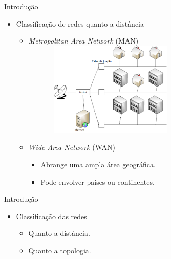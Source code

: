 \documentclass{libs/ufc_format}
\begin{document}
\begin{frame}{Introdução}
    \begin{itemize}
        \item Classificação de redes quanto a distância
            \begin{itemize}
                \item<1> \textit{Metropolitan Area Network} (MAN)\\
                \includegraphics[width=0.7\textwidth, height=4.5cm]{media/man}
                \item<2-> \textit{Wide Area Network} (WAN)
                    \begin{itemize}
                        \justifying
                        \item<3-> Abrange uma ampla área geográfica.
                        \item<3-> Pode envolver países ou continentes.
                    \end{itemize}
            \end{itemize}
    \end{itemize}
\end{frame}

\begin{frame}{Introdução}
    \begin{itemize}
        \item Classificação das redes
            \begin{itemize}
                \item Quanto a distância.
                \item \alert{Quanto a topologia}.
            \end{itemize}
    \end{itemize}
\end{frame}
\end{document}

